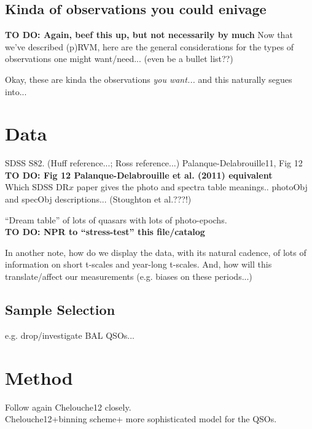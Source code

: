 \documentclass[11pt,a4paper]{article}
\begin{document}
\subsection{Kinda of observations you could enivage}
{\bf TO DO: Again, beef this up, but not necessarily by much}
Now that we've described (p)RVM, here are the general 
considerations for the types of observations one might want/need...
(even be a bullet list??)

Okay, these are kinda the observations {\it you want...}
and this naturally segues into...




\section{Data}
SDSS S82. 
(Huff reference...; Ross reference...)
Palanque-Delabrouille11, Fig 12  \\
{\bf TO DO: Fig 12 Palanque-Delabrouille et al. (2011)  equivalent}\\

Which SDSS DR$x$ paper gives the photo and spectra table meanings..
photoObj and specObj descriptions... (Stoughton et al.???!) 

``Dream table'' of lots of quasars with lots of photo-epochs.\\
{\bf TO DO: NPR to ``stress-test'' this file/catalog}

In another note, how do we display the data, with its natural cadence,
of lots of information on short t-scales and year-long t-scales.  And,
how will this translate/affect our measurements (e.g. biases on these
periods...)

    \subsection{Sample Selection}
    e.g. drop/investigate BAL QSOs...
    
    
    
\section{Method}
Follow again Chelouche12 closely. \\
Chelouche12+binning scheme+ more sophisticated model for the QSOs.
\end{document}
